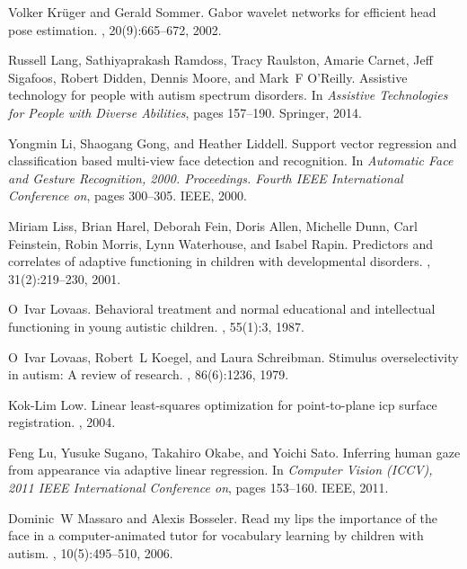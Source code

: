 \documentclass{ut-thesis}
\begin{document}
\begin{thebibliography}{100}
Volker Kr{\"u}ger and Gerald Sommer.
\newblock Gabor wavelet networks for efficient head pose estimation.
, 20(9):665--672, 2002.

Russell Lang, Sathiyaprakash Ramdoss, Tracy Raulston, Amarie Carnet, Jeff
  Sigafoos, Robert Didden, Dennis Moore, and Mark~F O’Reilly.
\newblock Assistive technology for people with autism spectrum disorders.
\newblock In {\em Assistive Technologies for People with Diverse Abilities},
  pages 157--190. Springer, 2014.

Yongmin Li, Shaogang Gong, and Heather Liddell.
\newblock Support vector regression and classification based multi-view face
  detection and recognition.
\newblock In {\em Automatic Face and Gesture Recognition, 2000. Proceedings.
  Fourth IEEE International Conference on}, pages 300--305. IEEE, 2000.

Miriam Liss, Brian Harel, Deborah Fein, Doris Allen, Michelle Dunn, Carl
  Feinstein, Robin Morris, Lynn Waterhouse, and Isabel Rapin.
\newblock Predictors and correlates of adaptive functioning in children with
  developmental disorders.
, 31(2):219--230,
  2001.

O~Ivar Lovaas.
\newblock Behavioral treatment and normal educational and intellectual
  functioning in young autistic children.
, 55(1):3, 1987.

O~Ivar Lovaas, Robert~L Koegel, and Laura Schreibman.
\newblock Stimulus overselectivity in autism: A review of research.
, 86(6):1236, 1979.

Kok-Lim Low.
\newblock Linear least-squares optimization for point-to-plane icp surface
  registration.
, 2004.

Feng Lu, Yusuke Sugano, Takahiro Okabe, and Yoichi Sato.
\newblock Inferring human gaze from appearance via adaptive linear regression.
\newblock In {\em Computer Vision (ICCV), 2011 IEEE International Conference
  on}, pages 153--160. IEEE, 2011.

Dominic~W Massaro and Alexis Bosseler.
\newblock Read my lips the importance of the face in a computer-animated tutor
  for vocabulary learning by children with autism.
, 10(5):495--510, 2006.


\end{thebibliography}
\end{document}
